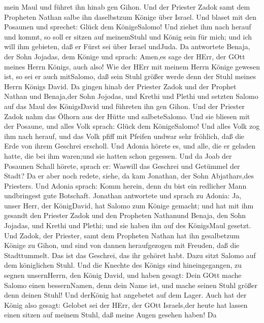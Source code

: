 mein Maul und führet ihn hinab gen Gihon.  Und der Priester
Zadok samt dem Propheten Nathan salbe ihn daselbstzum Könige über
Israel. Und blaset mit den Posaunen und sprechet: Glück dem
KönigeSalomo!  Und ziehet ihm nach herauf und kommt, so
soll er sitzen auf meinemStuhl und König sein für mich; und ich will ihm
gebieten, daß er Fürst sei über Israel undJuda.  Da
antwortete Benaja, der Sohn Jojadas, dem Könige und sprach: Amen,es sage
der HErr, der GOtt meines Herrn Königs, auch also!  Wie der
HErr mit meinem Herrn Könige gewesen ist, so sei er auch mitSalomo, daß
sein Stuhl größer werde denn der Stuhl meines Herrn Königs David.
 Da gingen hinab der Priester Zadok und der Prophet Nathan
und Benaja,der Sohn Jojodas, und Krethi und Plethi und setzten Salomo
auf das Maul des KönigsDavid und führeten ihn gen Gihon. 
Und der Priester Zadok nahm das Ölhorn aus der Hütte und salbeteSalomo.
Und sie bliesen mit der Posaune, und alles Volk sprach: Glück dem
KönigeSalomo!  Und alles Volk zog ihm nach herauf, und das
Volk pfiff mit Pfeifen undwar sehr fröhlich, daß die Erde von ihrem
Geschrei erscholl.  Und Adonia hörete es, und alle, die er
geladen hatte, die bei ihm waren;und sie hatten schon gegessen. Und da
Joab der Posaunen Schall hörete, sprach er: Waswill das Geschrei und
Getümmel der Stadt?  Da er aber noch redete, siehe, da kam
Jonathan, der Sohn Abjathars,des Priesters. Und Adonia sprach: Komm
herein, denn du bist ein redlicher Mann undbringest gute Botschaft.
 Jonathan antwortete und sprach zu Adonia: Ja, unser Herr,
der KönigDavid, hat Salomo zum Könige gemacht;  und hat mit
ihm gesandt den Priester Zadok und den Propheten Nathanund Benaja, den
Sohn Jojadas, und Krethi und Plethi; und sie haben ihn auf des
KönigsMaul gesetzt.  Und Zadok, der Priester, samt dem
Propheten Nathan hat ihn gesalbetzum Könige zu Gihon, und sind von
dannen heraufgezogen mit Freuden, daß die Stadttummelt. Das ist das
Geschrei, das ihr gehöret habt.  Dazu sitzt Salomo auf dem
königlichen Stuhl.  Und die Knechte des Königs sind
hineingegangen, zu segnen unsernHerrn, den König David, und haben
gesagt: Dein GOtt mache Salomo einen bessernNamen, denn dein Name ist,
und mache seinen Stuhl größer denn deinen Stuhl! Und derKönig hat
angebetet auf dem Lager.  Auch hat der König also gesagt:
Gelobet sei der HErr, der GOtt Israels,der heute hat lassen einen sitzen
auf meinem Stuhl, daß meine Augen gesehen haben!  Da
